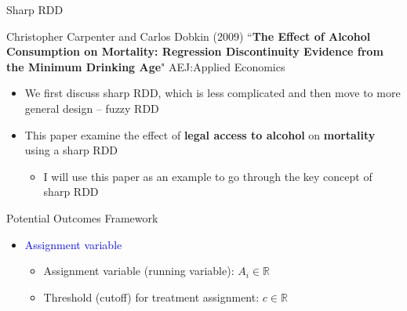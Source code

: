 \documentclass[hyperref={pdfpagelabels=false}]{beamer}
\begin{document}
\begin{frame}{Sharp RDD}
	
	Christopher Carpenter and Carlos Dobkin (2009) ``\textbf{The Effect of Alcohol Consumption on Mortality: Regression Discontinuity Evidence from the Minimum Drinking Age}" AEJ:Applied Economics
	
	\begin{itemize}
						\vspace{0.2cm}
		\item We first discuss sharp RDD, which is less complicated and then move to more general design -- fuzzy RDD
				\vspace{0.2cm}
		\item This paper examine the effect of \textbf{legal access to alcohol} on \textbf{mortality} using a sharp RDD
		\vspace{0.2cm}
			\begin{itemize}
		\item I will use this paper as an example to go through the key concept of sharp RDD
			\end{itemize}
	\end{itemize}
\end{frame}


\begin{frame}{Potential Outcomes Framework}{}
	
		\begin{itemize} 
	\item \textcolor{blue}{Assignment variable} 
		\vspace{0.2cm}
				\begin{itemize} 
		\item Assignment variable (running variable): $A_i\in \mathbb{R}$
		\vspace{0.2cm}
		\item Threshold (cutoff) for treatment assignment: $c\in \mathbb{R}$
		\vspace{0.2cm}
			\end{itemize}
		
	
		
	\end{itemize}
\end{frame}
\end{document}

